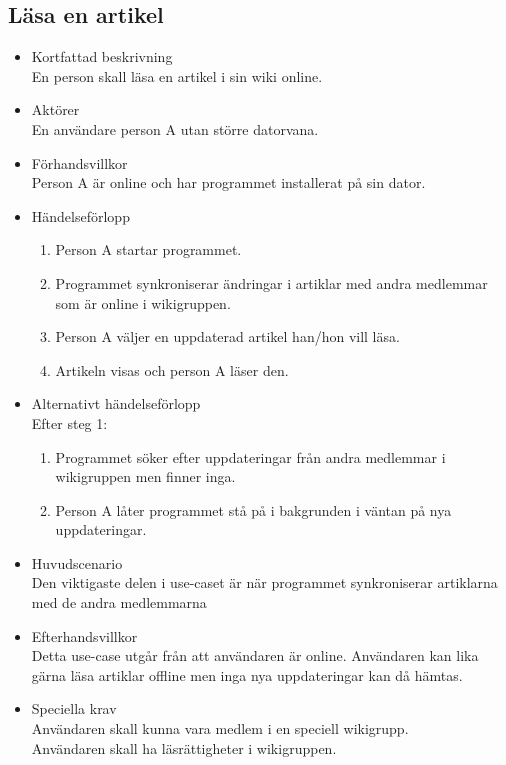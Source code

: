 \subsection{Läsa en artikel}
\begin{itemize}
	\item Kortfattad beskrivning
	\\En person skall läsa en artikel i sin wiki online.
	\item Aktörer
	\\En användare person A utan större datorvana.
	\item Förhandsvillkor
	\\Person A är online och har programmet installerat på sin dator.
	\item Händelseförlopp
	\begin{enumerate}
		\item Person A startar programmet.
		\item Programmet synkroniserar ändringar i artiklar med andra medlemmar som är online i wikigruppen.
		\item Person A väljer en uppdaterad artikel han/hon vill läsa.
		\item Artikeln visas och person A läser den.
	\end{enumerate}
	\item Alternativt händelseförlopp
	\\Efter steg 1:
	\begin{enumerate}	
		\item Programmet söker efter uppdateringar från andra medlemmar i wikigruppen men finner inga.
		\item Person A låter programmet stå på i bakgrunden i väntan på nya uppdateringar.	
	\end{enumerate}	
	\item Huvudscenario
	\\Den viktigaste delen i use-caset är när programmet synkroniserar artiklarna med de andra medlemmarna
	\item Efterhandsvillkor
	\\Detta use-case utgår från att användaren är online. Användaren kan lika gärna läsa artiklar offline men inga nya uppdateringar kan då hämtas.
	\item Speciella krav
	\\Användaren skall kunna vara medlem i en speciell wikigrupp.
	\\Användaren skall ha läsrättigheter i wikigruppen.
\end{itemize}


